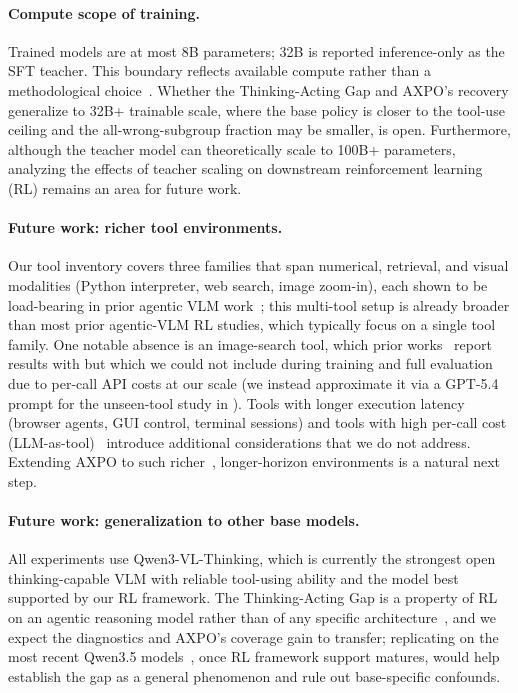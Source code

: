 \paragraph{Compute scope of training.}
Trained models are at most 8B parameters; 32B is reported inference-only as the SFT teacher. This boundary reflects available compute rather than a methodological choice~\citep{kim2026visualtokenpruningfails, lee2025maskingteacherreinforcingstudent, yu2026hideseereasoningprefixmasking, lee2026genrecalgenerationrecalibrationlarge, Lee_2025_CVPR}.
Whether the Thinking-Acting Gap and AXPO's recovery generalize to 32B+ trainable scale, where the base policy is closer to the tool-use ceiling and the all-wrong-subgroup fraction may be smaller, is open.
Furthermore, although the teacher model can theoretically scale to 100B+ parameters, analyzing the effects of teacher scaling on downstream reinforcement learning (RL) remains an area for future work.

\paragraph{Future work: richer tool environments.}
Our tool inventory covers three families that span numerical, retrieval, and visual modalities (Python interpreter, web search, image zoom-in), each shown to be load-bearing in prior agentic VLM work~\citep{deepeyesv2, pyvision-rl, mini-o3}; this multi-tool setup is already broader than most prior agentic-VLM RL studies, which typically focus on a single tool family. One notable absence is an image-search tool, which prior works~\citep{deepeyesv2,hrmmsearch} report results with but which we could not include during training and full evaluation due to per-call API costs at our scale (we instead approximate it via a GPT-5.4 prompt for the unseen-tool study in ). Tools with longer execution latency (browser agents, GUI control, terminal sessions) and tools with high per-call cost (LLM-as-tool)~\citep{toolorchestra} introduce additional considerations that we do not address.
Extending AXPO to such richer~\citep{lee2025refinebenchevaluatingrefinementcapability, Lee_2025_ICCV, yu2024sparkmultivisionsensorperception}, longer-horizon environments is a natural next step.

\paragraph{Future work: generalization to other base models.}
All experiments use Qwen3-VL-Thinking, which is currently the strongest open thinking-capable VLM with reliable tool-using ability and the model best supported by our RL framework. The Thinking-Acting Gap is a property of RL on an agentic reasoning model rather than of any specific architecture~\citep{NEURIPS2024_473a9a75, 10.1007/978-3-031-72967-6_16, lee-etal-2024-collavo, lee2024phantomlatentlargelanguage}, and we expect the diagnostics and AXPO's coverage gain to transfer; replicating on the most recent Qwen3.5 models~\citep{qwen35}, once RL framework support matures, would help establish the gap as a general phenomenon and rule out base-specific confounds.


